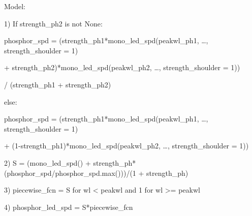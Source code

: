 \documentclass[letterpaper,10pt,english]{sphinxmanual}
\begin{document}
\begin{fulllineitems}
\begin{DUlineblock}{0em}
\item[] Model:
\item[]
\begin{DUlineblock}{\DUlineblockindent}
\item[] 1) If strength\_ph2 is not None:
\item[]
\begin{DUlineblock}{\DUlineblockindent}
\item[]
\begin{DUlineblock}{\DUlineblockindent}
\item[] phosphor\_spd = (strength\_ph1*mono\_led\_spd(peakwl\_ph1, …, strength\_shoulder = 1) 
\item[]
\begin{DUlineblock}{\DUlineblockindent}
\item[] + strength\_ph2)*mono\_led\_spd(peakwl\_ph2, …, strength\_shoulder = 1)) 
\item[]
\begin{DUlineblock}{\DUlineblockindent}
\item[] / (strength\_ph1 + strength\_ph2)
\end{DUlineblock}
\end{DUlineblock}
\end{DUlineblock}
\item[] else:
\item[]
\begin{DUlineblock}{\DUlineblockindent}
\item[] phosphor\_spd = (strength\_ph1*mono\_led\_spd(peakwl\_ph1, …, strength\_shoulder = 1) 
\item[]
\begin{DUlineblock}{\DUlineblockindent}
\item[] + (1-strength\_ph1)*mono\_led\_spd(peakwl\_ph2, …, strength\_shoulder = 1)) 
\item[] 
\end{DUlineblock}
\end{DUlineblock}
\end{DUlineblock}
\item[] 2) S = (mono\_led\_spd() + strength\_ph*(phosphor\_spd/phosphor\_spd.max()))/(1 + strength\_ph)
\item[] 
\item[] 3) piecewise\_fcn = S for wl \textless{} peakwl and 1 for wl \textgreater{}= peakwl
\item[] 
\item[] 4) phosphor\_led\_spd = S*piecewise\_fcn 

\end{DUlineblock}
\end{DUlineblock}
\end{fulllineitems}
\end{document}
